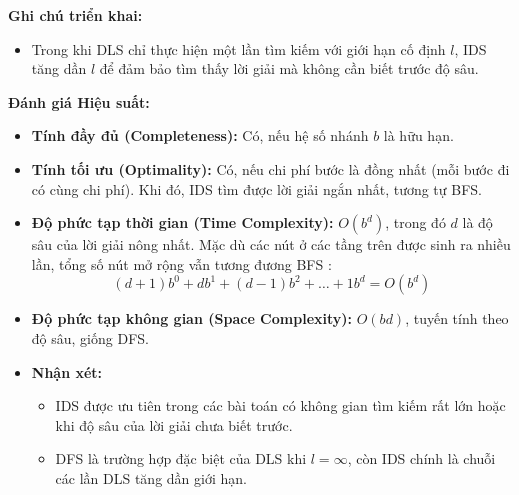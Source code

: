 \textbf{Ghi chú triển khai: }
\begin{itemize}
    \item Trong khi DLS chỉ thực hiện một lần tìm kiếm với giới hạn cố định $l$, IDS tăng dần $l$ để đảm bảo tìm thấy lời giải mà không cần biết trước độ sâu.
\end{itemize}

\textbf{Đánh giá Hiệu suất:}
\begin{itemize}
    \item \textbf{Tính đầy đủ (Completeness):} Có, nếu hệ số nhánh $b$ là hữu hạn.
    \item \textbf{Tính tối ưu (Optimality):} Có, nếu chi phí bước là đồng nhất (mỗi bước đi có cùng chi phí). Khi đó, IDS tìm được lời giải ngắn nhất, tương tự BFS.
    \item \textbf{Độ phức tạp thời gian (Time Complexity):} $O(b^d)$, trong đó $d$ là độ sâu của lời giải nông nhất.  
    Mặc dù các nút ở các tầng trên được sinh ra nhiều lần, tổng số nút mở rộng vẫn tương đương BFS \cite{russell2021}:
    \[
        (d+1)b^0 + db^1 + (d-1)b^2 + \dots + 1b^d = O(b^d)
    \]
    \item \textbf{Độ phức tạp không gian (Space Complexity):} $O(bd)$, tuyến tính theo độ sâu, giống DFS.
    \item \textbf{Nhận xét:} 
    \begin{itemize}
        \item IDS được ưu tiên trong các bài toán có không gian tìm kiếm rất lớn hoặc khi độ sâu của lời giải chưa biết trước.
        \item DFS là trường hợp đặc biệt của DLS khi $l = \infty$, còn IDS chính là chuỗi các lần DLS tăng dần giới hạn.
    \end{itemize}
\end{itemize}